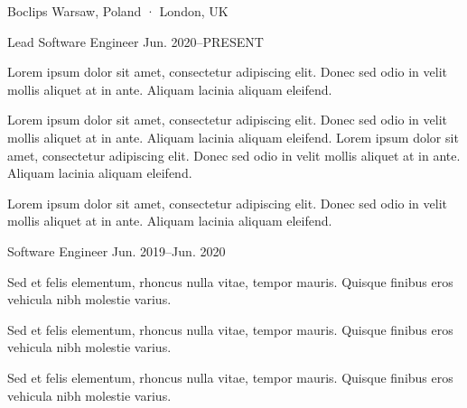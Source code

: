 
\begin{cventries}

  \multicventry
    {Boclips} %
    {Warsaw, Poland · London, UK} %
    {
      \multicventryitem
        {Lead Software Engineer} %
        {Jun. 2020–PRESENT} %
        {
          \begin{cvitems} %
            \item {Lorem ipsum dolor sit amet, consectetur adipiscing elit. Donec sed odio in velit mollis aliquet at in ante. Aliquam lacinia aliquam eleifend.}
            \item {Lorem ipsum dolor sit amet, consectetur adipiscing elit. Donec sed odio in velit mollis aliquet at in ante. Aliquam lacinia aliquam eleifend. Lorem ipsum dolor sit amet, consectetur adipiscing elit. Donec sed odio in velit mollis aliquet at in ante. Aliquam lacinia aliquam eleifend.}
            \item {Lorem ipsum dolor sit amet, consectetur adipiscing elit. Donec sed odio in velit mollis aliquet at in ante. Aliquam lacinia aliquam eleifend.}
          \end{cvitems}
        }
      \multicventryitem
        {Software Engineer} %
        {Jun. 2019–Jun. 2020} %
        {
          \begin{cvitems} %
            \item {Sed et felis elementum, rhoncus nulla vitae, tempor mauris. Quisque finibus eros vehicula nibh molestie varius.}
            \item {Sed et felis elementum, rhoncus nulla vitae, tempor mauris. Quisque finibus eros vehicula nibh molestie varius.}
            \item {Sed et felis elementum, rhoncus nulla vitae, tempor mauris. Quisque finibus eros vehicula nibh molestie varius.}
          \end{cvitems}
        }
    }


\end{cventries}
